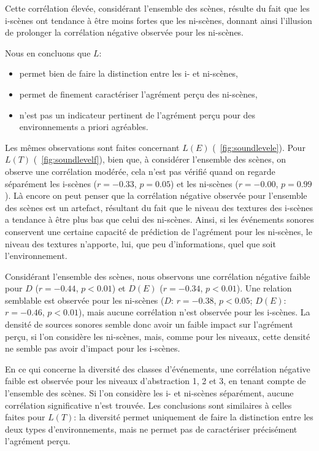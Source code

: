 Cette corrélation élevée, considérant l'ensemble des scènes, résulte du fait que les i-scènes ont tendance à être moins fortes que les ni-scènes, donnant ainsi l'illusion de prolonger la corrélation négative observée pour les ni-scènes.  

Nous en concluons que $L$:

\begin{itemize}
\item permet bien de faire la distinction entre les i- et ni-scènes,
\item permet de finement caractériser l'agrément perçu des ni-scènes,
\item n'est pas un indicateur pertinent de l'agrément perçu pour des environnements a priori agréables.
\end{itemize}

Les mêmes observations sont faites concernant $L(E)$ (\cf~\ref{fig:soundlevele}). Pour $L(T)$ (\cf~\ref{fig:soundlevelf}), bien que, à considérer l'ensemble des scènes, on observe une corrélation modérée, cela n'est pas vérifié quand on regarde séparément les i-scènes ($r=-0.33$, $p=0.05$) et les ni-scènes ($r=-0.00$, $p=0.99$). Là encore on peut penser que la corrélation négative observée pour l'ensemble des scènes est un artefact, résultant du fait que le niveau des textures des i-scènes a tendance à être plus bas que celui des ni-scènes. Ainsi, si les événements sonores conservent une certaine capacité de prédiction de l'agrément pour les ni-scènes, le niveau des textures n'apporte, lui, que peu d'informations, quel que soit l'environnement.

Considérant l'ensemble des scènes, nous observons une corrélation négative faible pour $D$ ($r=-0.44$, $p<0.01$) et $D(E)$ ($r=-0.34$, $p<0.01$). Une relation semblable est observée pour les ni-scènes ($D$: $r=-0.38$, $p<0.05$; $D(E)$: $r=-0.46$, $p<0.01$), mais aucune corrélation n'est observée pour les i-scènes. La densité de sources sonores semble donc avoir un faible impact sur l'agrément perçu, si l'on considère les ni-scènes, mais, comme pour les niveaux, cette densité ne semble pas avoir d'impact pour les i-scènes.

En ce qui concerne la diversité des classes d'événements, une corrélation négative faible est observée pour les niveaux d'abstraction 1, 2 et 3, en tenant compte de l'ensemble des scènes. Si l'on considère les i- et ni-scènes séparément, aucune corrélation significative n'est trouvée. Les conclusions sont similaires à celles faites pour $L(T)$: la diversité permet uniquement de faire la distinction entre les deux types d'environnements, mais ne permet pas de caractériser précisément l'agrément perçu.

